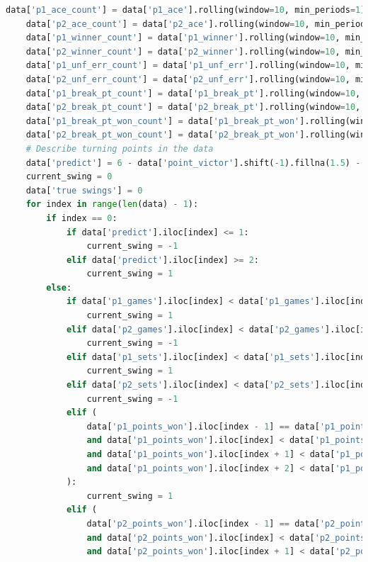 \documentclass[UTF8]{ctexart} %
\begin{document}
\begin{lstlisting}[language=Python, caption=Code of Data Cleaning and Logistic Regression Model]
    data['p1_ace_count'] = data['p1_ace'].rolling(window=10, min_periods=1).sum()
    data['p2_ace_count'] = data['p2_ace'].rolling(window=10, min_periods=1).sum()
    data['p1_winner_count'] = data['p1_winner'].rolling(window=10, min_periods=1).sum()
    data['p2_winner_count'] = data['p2_winner'].rolling(window=10, min_periods=1).sum()
    data['p1_unf_err_count'] = data['p1_unf_err'].rolling(window=10, min_periods=1).sum()
    data['p2_unf_err_count'] = data['p2_unf_err'].rolling(window=10, min_periods=1).sum()
    data['p1_break_pt_count'] = data['p1_break_pt'].rolling(window=10, min_periods=1).sum()
    data['p2_break_pt_count'] = data['p2_break_pt'].rolling(window=10, min_periods=1).sum()
    data['p1_break_pt_won_count'] = data['p1_break_pt_won'].rolling(window=10, min_periods=1).sum()
    data['p2_break_pt_won_count'] = data['p2_break_pt_won'].rolling(window=10, min_periods=1).sum()
    # Describe turning points in the data
    data['predict'] = 6 - data['point_victor'].shift(-1).fillna(1.5) - data['point_victor'].shift(-2).fillna(1.5) - data['point_victor'].shift(-3).fillna(1.5)
    current_swing = 0
    data['true swings'] = 0
    for index in range(len(data) - 1):
        if index == 0:
            if data['predict'].iloc[index] <= 1:
                current_swing = -1
            elif data['predict'].iloc[index] >= 2:
                current_swing = 1
        else:
            if data['p1_games'].iloc[index] < data['p1_games'].iloc[index + 1]:
                current_swing = 1
            elif data['p2_games'].iloc[index] < data['p2_games'].iloc[index + 1]:
                current_swing = -1
            elif data['p1_sets'].iloc[index] < data['p1_sets'].iloc[index + 1]:
                current_swing = 1
            elif data['p2_sets'].iloc[index] < data['p2_sets'].iloc[index + 1]:
                current_swing = -1
            elif (
                data['p1_points_won'].iloc[index - 1] == data['p1_points_won'].iloc[index]
                and data['p1_points_won'].iloc[index] < data['p1_points_won'].iloc[index + 1]
                and data['p1_points_won'].iloc[index + 1] < data['p1_points_won'].iloc[index + 2]
                and data['p1_points_won'].iloc[index + 2] < data['p1_points_won'].iloc[index + 3]
            ):
                current_swing = 1
            elif (
                data['p2_points_won'].iloc[index - 1] == data['p2_points_won'].iloc[index]
                and data['p2_points_won'].iloc[index] < data['p2_points_won'].iloc[index + 1]
                and data['p2_points_won'].iloc[index + 1] < data['p2_points_won'].iloc[index + 2]

\end{lstlisting}
\end{document}
